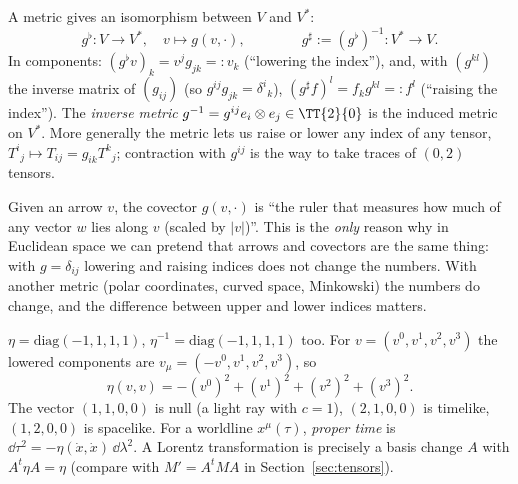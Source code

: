 \begin{formal}
A metric gives an isomorphism between $V$ and $V^*$:
\[
g^\flat:V\to V^*,\quad v\mapsto g(v,\cdot),\qquad\qquad g^\sharp:=(g^\flat)^{-1}:V^*\to V.
\]
In components: $(g^\flat v)_k=v^jg_{jk}=:v_k$ (``lowering the index''), and, with $(g^{kl})$ the inverse matrix of $(g_{ij})$ (so $g^{ij}g_{jk}=\delta^i{}_k$), $(g^\sharp f)^l=f_kg^{kl}=:f^l$ (``raising the index''). The \emph{inverse metric} $g^{-1}=g^{ij}e_i\otimes e_j\in\TT{2}{0}$ is the induced metric on $V^*$. More generally the metric lets us raise or lower any index of any tensor, \eg $T^i{}_j\mapsto T_{ij}=g_{ik}T^k{}_j$; contraction with $g^{ij}$ is the way to take traces of $(0,2)$ tensors.
\end{formal}

\begin{intuition}
Given an arrow $v$, the covector $g(v,\cdot)$ is ``the ruler that measures how much of any vector $w$ lies along $v$ (scaled by $|v|$)''. This is the \emph{only} reason why in Euclidean space we can pretend that arrows and covectors are the same thing: with $g=\delta_{ij}$ lowering and raising indices does not change the numbers. With another metric (polar coordinates, curved space, Minkowski) the numbers do change, and the difference between upper and lower indices matters.
\end{intuition}

\begin{example}
$\eta=\mathrm{diag}(-1,1,1,1)$, $\eta^{-1}=\mathrm{diag}(-1,1,1,1)$ too. For $v=(v^0,v^1,v^2,v^3)$ the lowered components are $v_\mu=(-v^0,v^1,v^2,v^3)$, so
\[
\eta(v,v)=-(v^0)^2+(v^1)^2+(v^2)^2+(v^3)^2.
\]
The vector $(1,1,0,0)$ is null (a light ray with $c=1$), $(2,1,0,0)$ is timelike, $(1,2,0,0)$ is spacelike. For a worldline $x^\mu(\tau)$, \emph{proper time} is $\dd\tau^2=-\eta(\dot x,\dot x)\,\dd\lambda^2$. A Lorentz transformation is precisely a basis change $A$ with $A^t\eta A=\eta$ (compare with $M'=A^tMA$ in Section~\ref{sec:tensors}).
\end{example}

